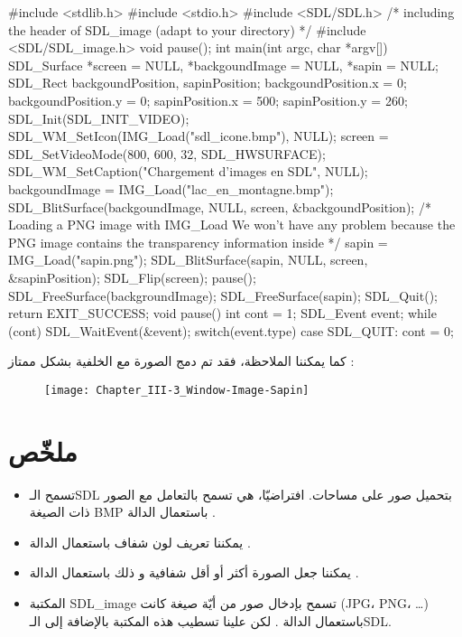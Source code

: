 \begin{Csource}
#include <stdlib.h>
#include <stdio.h>
#include <SDL/SDL.h>
/* including the header of SDL_image (adapt to your directory) */
#include <SDL/SDL_image.h> 
void pause();
int main(int argc, char *argv[])
{
	SDL_Surface *screen = NULL, *backgoundImage = NULL, *sapin = NULL;
	SDL_Rect backgoundPosition, sapinPosition;
	backgoundPosition.x = 0;
	backgoundPosition.y = 0;
	sapinPosition.x = 500;
	sapinPosition.y = 260;
	SDL_Init(SDL_INIT_VIDEO);
	SDL_WM_SetIcon(IMG_Load("sdl_icone.bmp"), NULL);
	screen = SDL_SetVideoMode(800, 600, 32, SDL_HWSURFACE);
	SDL_WM_SetCaption("Chargement d'images en SDL", NULL);
	backgoundImage = IMG_Load("lac_en_montagne.bmp");
	SDL_BlitSurface(backgoundImage, NULL, screen, &backgoundPosition);
	/* Loading a PNG image with IMG_Load
	We won't have any problem because the PNG image contains the transparency information inside */
	sapin = IMG_Load("sapin.png");
	SDL_BlitSurface(sapin, NULL, screen, &sapinPosition); 
	SDL_Flip(screen);
	pause();
	SDL_FreeSurface(backgroundImage);
	SDL_FreeSurface(sapin);
	SDL_Quit();
	return EXIT_SUCCESS;
} 
void pause()
{
	int cont = 1;
	SDL_Event event;
	while (cont)
	{
		SDL_WaitEvent(&event);
		switch(event.type)
		{
			case SDL_QUIT:
			cont = 0;
		}
	}
}
\end{Csource}

كما يمكننا الملاحظة، فقد تم دمج الصورة مع الخلفية بشكل ممتاز :

\begin{figure}[H]
	\centering
	\texttt{[image: Chapter\_III-3\_Window-Image-Sapin]}
\end{figure}

\section*{ملخّص}

\begin{itemize}
	\item تسمح الـ\textenglish{SDL}
	بتحميل صور على مساحات. افتراضيّا، هي تسمح بالتعامل مع الصور ذات الصيغة
	\textenglish{BMP}
	باستعمال الدالة
	.
	\item يمكننا تعريف لون شفاف باستعمال الدالة
	.
	\item يمكننا جعل الصورة أكثر أو أقل شفافية و ذلك باستعمال الدالة 
	.
	\item المكتبة
	\textenglish{SDL\_image}
	تسمح بإدخال صور من أيّة صيغة كانت
	(\textenglish{JPG}، \textenglish{PNG}، \dots)
	باستعمال الدالة
	.
	لكن علينا تسطيب هذه المكتبة بالإضافة إلى الـ\textenglish{SDL}.
\end{itemize}

